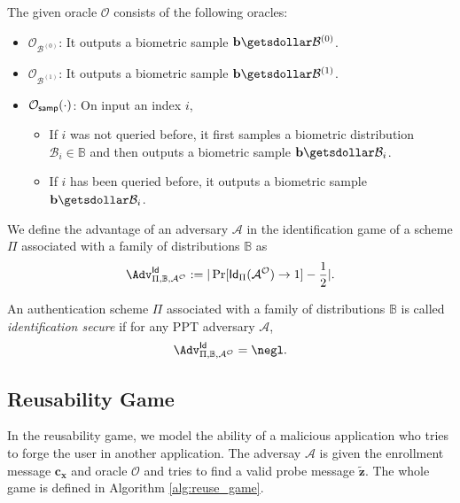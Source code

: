 The given oracle $\mathcal{O}$ consists of the following oracles:

\begin{itemize}
	\item $\mathcal{O}_{\mathcal{B}^{(0)}}$: It outputs a biometric sample $\mathbf{b} \getsdollar \mathcal{B}^{(0)}$.

	\item $\mathcal{O}_{\mathcal{B}^{(1)}}$: It outputs a biometric sample $\mathbf{b} \getsdollar \mathcal{B}^{(1)}$.

	\item $\mathcal{O}_{\sf samp}(\cdot)$: On input an index $i$,
	\begin{itemize}
		\item If $i$ was not queried before, it first samples a biometric distribution $\mathcal{B}_i \in \mathbb{B}$ and then outputs a biometric sample $\mathbf{b} \getsdollar \mathcal{B}_i$.
		\item If $i$ has been queried before, it outputs a biometric sample $\mathbf{b} \getsdollar \mathcal{B}_i$.
	\end{itemize}
	
\end{itemize}

We define the advantage of an adversary $\mathcal{A}$ in the identification game of a scheme $\Pi$ associated with a family of distributions $\mathbb{B}$ as
\[
	\Adv^{\sf Id}_{\Pi, \mathbb{B}, \mathcal{A}^\mathcal{O}} := |\Pr[{\sf Id}_{\Pi}(\mathcal{A}^\mathcal{O}) \to 1] - \frac{1}{2}|.
\]

An authentication scheme $\Pi$ associated with a family of distributions $\mathbb{B}$ is called \emph{identification secure} if for any PPT adversary $\mathcal{A}$,
\[
	\Adv^{\sf Id}_{\Pi, \mathbb{B}, \mathcal{A}^\mathcal{O}} = \negl.
\]


\subsection{Reusability Game}
\label{sec:reuse_game}

In the reusability game, we model the ability of a malicious application who tries to forge the user in another application. The adversay $\mathcal{A}$ is given the enrollment message $\mathbf{c_x}$ and oracle $\mathcal{O}$ and tries to find a valid probe message $\mathbf{\tilde{z}}$. The whole game is defined in Algorithm \ref{alg:reuse_game}.


